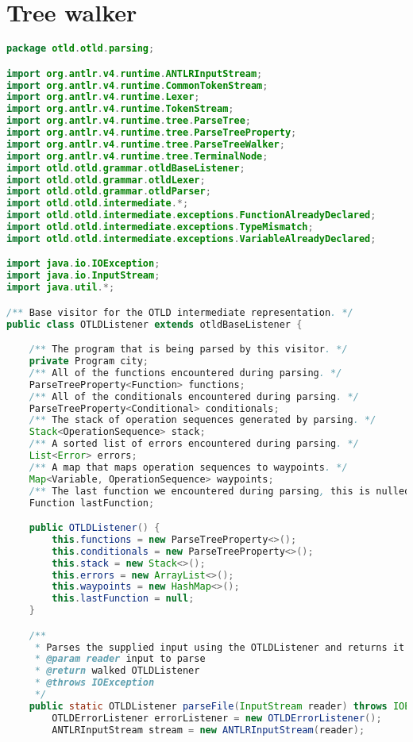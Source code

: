 \chapter{Tree walker}

\begin{landscape}
\begin{lstlisting}[language=Java]
package otld.otld.parsing;

import org.antlr.v4.runtime.ANTLRInputStream;
import org.antlr.v4.runtime.CommonTokenStream;
import org.antlr.v4.runtime.Lexer;
import org.antlr.v4.runtime.TokenStream;
import org.antlr.v4.runtime.tree.ParseTree;
import org.antlr.v4.runtime.tree.ParseTreeProperty;
import org.antlr.v4.runtime.tree.ParseTreeWalker;
import org.antlr.v4.runtime.tree.TerminalNode;
import otld.otld.grammar.otldBaseListener;
import otld.otld.grammar.otldLexer;
import otld.otld.grammar.otldParser;
import otld.otld.intermediate.*;
import otld.otld.intermediate.exceptions.FunctionAlreadyDeclared;
import otld.otld.intermediate.exceptions.TypeMismatch;
import otld.otld.intermediate.exceptions.VariableAlreadyDeclared;

import java.io.IOException;
import java.io.InputStream;
import java.util.*;

/** Base visitor for the OTLD intermediate representation. */
public class OTLDListener extends otldBaseListener {

    /** The program that is being parsed by this visitor. */
    private Program city;
    /** All of the functions encountered during parsing. */
    ParseTreeProperty<Function> functions;
    /** All of the conditionals encountered during parsing. */
    ParseTreeProperty<Conditional> conditionals;
    /** The stack of operation sequences generated by parsing. */
    Stack<OperationSequence> stack;
    /** A sorted list of errors encountered during parsing. */
    List<Error> errors;
    /** A map that maps operation sequences to waypoints. */
    Map<Variable, OperationSequence> waypoints;
    /** The last function we encountered during parsing, this is nulled after each factory exit. */
    Function lastFunction;

    public OTLDListener() {
        this.functions = new ParseTreeProperty<>();
        this.conditionals = new ParseTreeProperty<>();
        this.stack = new Stack<>();
        this.errors = new ArrayList<>();
        this.waypoints = new HashMap<>();
        this.lastFunction = null;
    }

    /**
     * Parses the supplied input using the OTLDListener and returns it after walking it
     * @param reader input to parse
     * @return walked OTLDListener
     * @throws IOException
     */
    public static OTLDListener parseFile(InputStream reader) throws IOException {
        OTLDErrorListener errorListener = new OTLDErrorListener();
        ANTLRInputStream stream = new ANTLRInputStream(reader);


\end{lstlisting}
\end{landscape}
